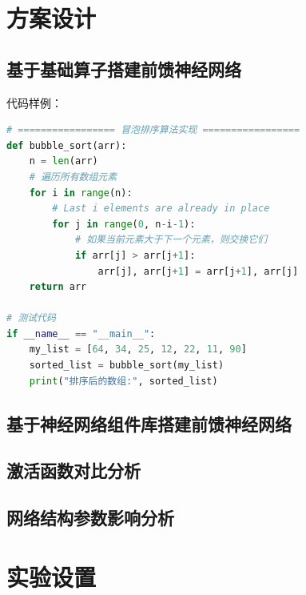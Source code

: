 \documentclass{style/course-report}
\begin{document}
\section{方案设计}


\subsection{基于基础算子搭建前馈神经网络}

代码样例：

\begin{lstlisting}[language=Python]
# ================= 冒泡排序算法实现 =================
def bubble_sort(arr):
    n = len(arr)
    # 遍历所有数组元素
    for i in range(n):
        # Last i elements are already in place
        for j in range(0, n-i-1):
            # 如果当前元素大于下一个元素，则交换它们
            if arr[j] > arr[j+1]:
                arr[j], arr[j+1] = arr[j+1], arr[j]
    return arr

# 测试代码
if __name__ == "__main__":
    my_list = [64, 34, 25, 12, 22, 11, 90]
    sorted_list = bubble_sort(my_list)
    print("排序后的数组:", sorted_list)
\end{lstlisting}

\subsection{基于神经网络组件库搭建前馈神经网络}

\subsection{激活函数对比分析}

\subsection{网络结构参数影响分析}



\section{实验设置}
\end{document}
